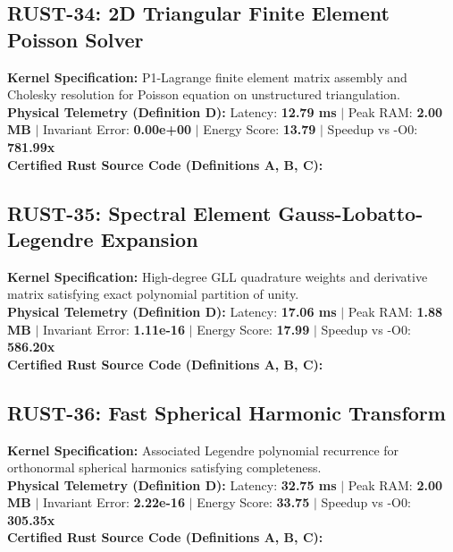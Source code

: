 \vspace{1em}
\subsection{RUST-34: 2D Triangular Finite Element Poisson Solver}
\textbf{Kernel Specification:} P1-Lagrange finite element matrix assembly and Cholesky resolution for Poisson equation on unstructured triangulation.\\
\textbf{Physical Telemetry (Definition D):} Latency: \textbf{12.79 ms} $|$ Peak RAM: \textbf{2.00 MB} $|$ Invariant Error: \textbf{0.00e+00} $|$ Energy Score: \textbf{13.79} $|$ Speedup vs -O0: \textbf{781.99x}\\

\textbf{Certified Rust Source Code (Definitions A, B, C):}


\vspace{1em}
\subsection{RUST-35: Spectral Element Gauss-Lobatto-Legendre Expansion}
\textbf{Kernel Specification:} High-degree GLL quadrature weights and derivative matrix satisfying exact polynomial partition of unity.\\
\textbf{Physical Telemetry (Definition D):} Latency: \textbf{17.06 ms} $|$ Peak RAM: \textbf{1.88 MB} $|$ Invariant Error: \textbf{1.11e-16} $|$ Energy Score: \textbf{17.99} $|$ Speedup vs -O0: \textbf{586.20x}\\

\textbf{Certified Rust Source Code (Definitions A, B, C):}


\vspace{1em}
\subsection{RUST-36: Fast Spherical Harmonic Transform}
\textbf{Kernel Specification:} Associated Legendre polynomial recurrence for orthonormal spherical harmonics satisfying completeness.\\
\textbf{Physical Telemetry (Definition D):} Latency: \textbf{32.75 ms} $|$ Peak RAM: \textbf{2.00 MB} $|$ Invariant Error: \textbf{2.22e-16} $|$ Energy Score: \textbf{33.75} $|$ Speedup vs -O0: \textbf{305.35x}\\

\textbf{Certified Rust Source Code (Definitions A, B, C):}


